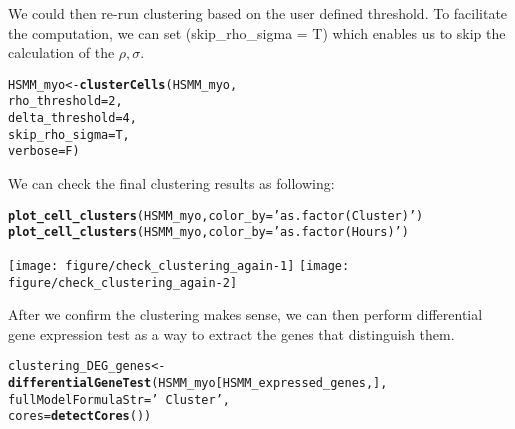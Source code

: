 \documentclass[10pt,oneside]{article}\usepackage[]{graphicx}\usepackage[]{color}
\makeatletter
\def\maxwidth{ %
  \ifdim\Gin@nat@width>\linewidth
    \linewidth
  \else
    \Gin@nat@width
  \fi
}
\newcommand{\hlnum}[1]{\textcolor[rgb]{0.686,0.059,0.569}{#1}}%
\newcommand{\hlstr}[1]{\textcolor[rgb]{0.192,0.494,0.8}{#1}}%
\newcommand{\hlstd}[1]{\textcolor[rgb]{0.345,0.345,0.345}{#1}}%
\newcommand{\hlkwb}[1]{\textcolor[rgb]{0.69,0.353,0.396}{#1}}%
\newcommand{\hlkwc}[1]{\textcolor[rgb]{0.333,0.667,0.333}{#1}}%
\newcommand{\hlkwd}[1]{\textcolor[rgb]{0.737,0.353,0.396}{\textbf{#1}}}%
\newenvironment{kframe}{%
 \def\at@end@of@kframe{}%
 \ifinner\ifhmode%
  \def\at@end@of@kframe{\end{minipage}}%
  \begin{minipage}{\columnwidth}%
 \fi\fi%
 \def\FrameCommand##1{\hskip\@totalleftmargin \hskip-\fboxsep
 \colorbox{shadecolor}{##1}\hskip-\fboxsep
     \hskip-\linewidth \hskip-\@totalleftmargin \hskip\columnwidth}%
 \MakeFramed {\advance\hsize-\width
   \@totalleftmargin\z@ \linewidth\hsize
   \@setminipage}}%
 {\par\unskip\endMakeFramed%
 \at@end@of@kframe}
\newenvironment{knitrout}{}{} %
\makeatother
\begin{document}
We could then re-run clustering based on the user defined threshold. To 
facilitate the computation, we can set \Rfunction(skip\_rho\_sigma = T) 
which enables us to skip the calculation of the $\rho, \sigma$.  
\begin{knitrout}
\color{fgcolor}\begin{kframe}
\begin{alltt}
\hlstd{HSMM_myo} \hlkwb{<-} \hlkwd{clusterCells}\hlstd{(HSMM_myo,}
                         \hlkwc{rho_threshold} \hlstd{=} \hlnum{2}\hlstd{,}
                         \hlkwc{delta_threshold} \hlstd{=} \hlnum{4}\hlstd{,}
                         \hlkwc{skip_rho_sigma} \hlstd{= T,}
                         \hlkwc{verbose} \hlstd{= F)}
\end{alltt}
\end{kframe}
\end{knitrout}

We can check the final clustering results as following: 
\begin{knitrout}
\color{fgcolor}\begin{kframe}
\begin{alltt}
\hlkwd{plot_cell_clusters}\hlstd{(HSMM_myo,} \hlkwc{color_by} \hlstd{=} \hlstr{'as.factor(Cluster)'}\hlstd{)}
\hlkwd{plot_cell_clusters}\hlstd{(HSMM_myo,} \hlkwc{color_by} \hlstd{=} \hlstr{'as.factor(Hours)'}\hlstd{)}
\end{alltt}
\end{kframe}
\texttt{[image: figure/check\_clustering\_again-1]} 
\texttt{[image: figure/check\_clustering\_again-2]} 

\end{knitrout}

After we confirm the clustering makes sense, we can then perform differential 
gene expression test as a way to extract the genes that distinguish them. 
\begin{knitrout}
\color{fgcolor}\begin{kframe}
\begin{alltt}
\hlstd{clustering_DEG_genes} \hlkwb{<-} \hlkwd{differentialGeneTest}\hlstd{(HSMM_myo[HSMM_expressed_genes,],}
                                             \hlkwc{fullModelFormulaStr} \hlstd{=} \hlstr{'~Cluster'}\hlstd{,}
                                             \hlkwc{cores} \hlstd{=} \hlkwd{detectCores}\hlstd{())}
\end{alltt}
\end{kframe}
\end{knitrout}
\end{document}
